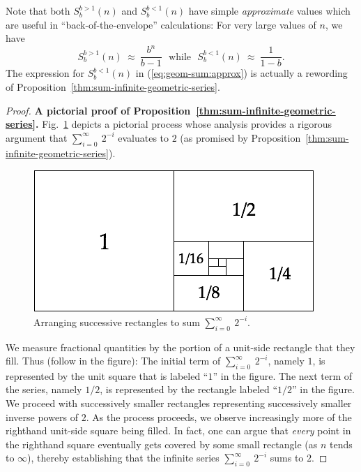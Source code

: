 Note that both $S^{b>1}_{b}(n)$ and $S^{b<1}_{b}(n)$ have simple {\em
  approximate} values which are useful in ``back-of-the-envelope''
calculations: For very large values of $n$, we have
\begin{equation}
\label{eq:geom-sum:approx}
S^{b>1}_{b}(n) \ \approx \ \frac{b^n}{b-1} \ \ \
\mbox{while} \ \ \
S^{b<1}_{b}(n) \ \approx \ \frac{1}{1-b} .
\end{equation}
The expression for $S^{b<1}_{b}(n)$ in (\ref{eq:geom-sum:approx}) is
actually a rewording of
Proposition~\ref{thm:sum-infinite-geometric-series}.

\medskip

\begin{proof}
{\bf A pictorial proof of Proposition~\ref{thm:sum-infinite-geometric-series}.}
%
Fig.~\ref{fig:sumGeoBasis} depicts a pictorial process whose analysis
provides a rigorous argument that $\displaystyle \sum_{i=0}^\infty
\ 2^{-i}$ evaluates to $2$ (as promised by
Proposition~\ref{thm:sum-infinite-geometric-series}).
\begin{figure}[h]
\begin{center}
       \includegraphics[scale=0.4]{FiguresMaths/SumGeometric1sur2Bis}
 \caption{Arranging successive rectangles to sum $\displaystyle
   \sum_{i=0}^\infty \ 2^{-i}$.}
       \label{fig:sumGeoBasis}
\end{center}
\end{figure}
We measure fractional quantities by the portion of a unit-side
rectangle that they fill.  Thus (follow in the figure): The initial
term of $\displaystyle \sum_{i=0}^\infty \ 2^{-i}$, namely $1$, is
represented by the unit square that is labeled ``$1$'' in the figure.
The next term of the series, namely $1/2$, is represented by the
rectangle labeled ``$1/2$'' in the figure.  We proceed with
successively smaller rectangles representing successively smaller
inverse powers of $2$.  As the process proceeds, we observe
increasingly more of the righthand unit-side square being filled.  In
fact, one can argue that {\em every} point in the righthand square
eventually gets covered by some small rectangle (as $n$ tends to
$\infty$), thereby establishing that the infinite series
$\displaystyle \sum_{i=0}^\infty \ 2^{-i}$ sums to $2$.


\end{proof}
